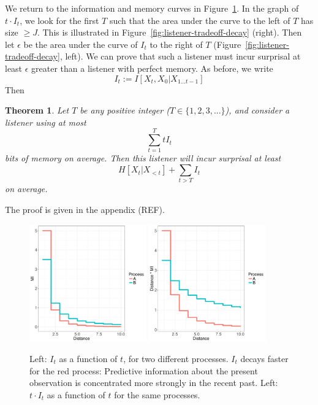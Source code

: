 \documentclass[11pt,letterpaper]{article}
\newcounter{theorem}
\newtheorem{thm}[theorem]{Theorem}
\begin{document}
We return to the information and memory curves in Figure~\ref{fig:basic}.
In the graph of $t \cdot I_t$, we look for the first $T$ such that the area under the curve to the left of $T$ has size $\geq J$.
This is illustrated in Figure~\ref{fig:listener-tradeoff-decay} (right).
Then let $\epsilon$ be the area under the curve of $I_t$ to the right of $T$ (Figure~\ref{fig:listener-tradeoff-decay}, left).
We can prove that such a listener must incur surprisal at least $\epsilon$ greater than a listener with perfect memory.
As before, we write $$I_t := I[X_t, X_0 | X_{1\dots t-1}]$$
Then


\begin{thm}\label{prop:suboptimal}
	Let $T$ be any positive integer ($T \in \{1, 2, 3, ...\}$), and consider a listener using at most
	\begin{equation}\label{eq:memory}
		\sum_{t=1}^T t I_t
	\end{equation}
bits of memory on average.
Then this listener will incur surprisal at least
	$$H[X_t|X_{<t}] + \sum_{t > T} I_t$$
	on average.
\end{thm}
The proof is given in the appendix (REF).



\begin{figure}
\includegraphics[width=0.45\textwidth]{toy/decay.pdf}
\includegraphics[width=0.45\textwidth]{toy/memory.pdf}
%
	\caption{Left: $I_t$ as a function of $t$, for two different processes. $I_t$ decays faster for the red process: Predictive information about the present observation is concentrated more strongly in the recent past. Left: $t \cdot I_t$ as a function of $t$ for the same processes. }\label{fig:basic}
\end{figure}
\end{document}
